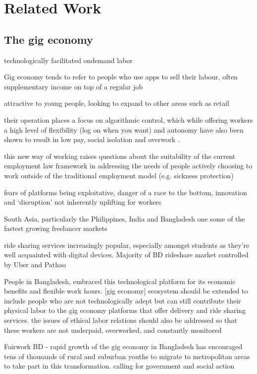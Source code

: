 \section{Related Work}

\subsection{The gig economy }

technologically facilitated ondemand labor 

Gig economy tends to refer to people who use apps to sell their labour, often supplementary income on top of a regular job \cite{Taylor2017}

attractive to young people, looking to expand to other areas such as retail \cite{Balaram2017}

their operation places a focus on algorithmic control, which while offering workers a high level of flexibility (log on when you want) and autonomy have also been shown to result in low pay, social isolation and overwork \cite{Wood2019}.

this new way of working raises questions about the suitability of the current employment law framework in addressing the needs of people actively choosing to work outside of the traditional employment model (e.g. sickness protection) \cite{Taylor2017}

fears of platforms being exploitative, danger of a race to the bottom, innovation and `disruption' not inherently uplifting for workers \cite{Balaram2017}

South Asia, particularly the Philippines, India and Bangladesh one some of the fastest growing freelancer markets \cite{Payoneer2019}

ride sharing services increasingly popular, especially amongst students as they're well acquainted with digital devices. Majority of BD rideshare market controlled by Uber and Pathao \cite{islam2019}

People in Bangladesh, embraced this technological platform for its economic benefits and flexible work hours. [gig economy] ecosystem should be extended to include people who are not technologically adept but can still contribute their physical labor to the gig economy platforms
that offer delivery and ride sharing services. the issues of ethical labor relations should also be addressed so that these workers are not underpaid, overworked, and constantly monitored \cite{Ahmed2020}

Fairwork BD - rapid growth of the gig economy in Bangladesh has encouraged tens of thousands of rural and suburban youths to migrate to metropolitan areas to take part in this transformation. calling for government and social action \cite{Fairwork2021}

